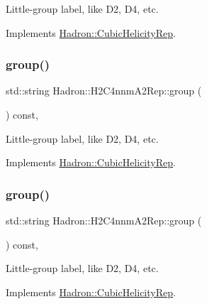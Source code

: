 Little-\/group label, like D2, D4, etc. 

Implements \mbox{\hyperlink{structHadron_1_1CubicHelicityRep_a101a7d76cd8ccdad0f272db44b766113}{Hadron\+::\+Cubic\+Helicity\+Rep}}.

\mbox{\label{structHadron_1_1H2C4nnmA2Rep_a5a67d986be4ac8ac591051bea3159855}} 
\subsubsection{\texorpdfstring{group()}{group()}\hspace{0.1cm}{\footnotesize\ttfamily [3/5]}}
{\footnotesize\ttfamily std\+::string Hadron\+::\+H2\+C4nnm\+A2\+Rep\+::group (\begin{DoxyParamCaption}{ }\end{DoxyParamCaption}) const\hspace{0.3cm}{\ttfamily [inline]}, {\ttfamily [virtual]}}

Little-\/group label, like D2, D4, etc. 

Implements \mbox{\hyperlink{structHadron_1_1CubicHelicityRep_a101a7d76cd8ccdad0f272db44b766113}{Hadron\+::\+Cubic\+Helicity\+Rep}}.

\mbox{\label{structHadron_1_1H2C4nnmA2Rep_a5a67d986be4ac8ac591051bea3159855}} 
\subsubsection{\texorpdfstring{group()}{group()}\hspace{0.1cm}{\footnotesize\ttfamily [4/5]}}
{\footnotesize\ttfamily std\+::string Hadron\+::\+H2\+C4nnm\+A2\+Rep\+::group (\begin{DoxyParamCaption}{ }\end{DoxyParamCaption}) const\hspace{0.3cm}{\ttfamily [inline]}, {\ttfamily [virtual]}}

Little-\/group label, like D2, D4, etc. 

Implements \mbox{\hyperlink{structHadron_1_1CubicHelicityRep_a101a7d76cd8ccdad0f272db44b766113}{Hadron\+::\+Cubic\+Helicity\+Rep}}.


